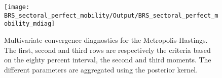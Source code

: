  
\begin{figure}[H]
\centering 
\texttt{[image: BRS\_sectoral\_perfect\_mobility/Output/BRS\_sectoral\_perfect\_mobility\_mdiag]}
\caption{Multivariate convergence diagnostics for the Metropolis-Hastings.
The first, second and third rows are respectively the criteria based on
the eighty percent interval, the second and third moments. The different 
parameters are aggregated using the posterior kernel.}\label{Fig:MultivariateDiagnostics}
\end{figure}

